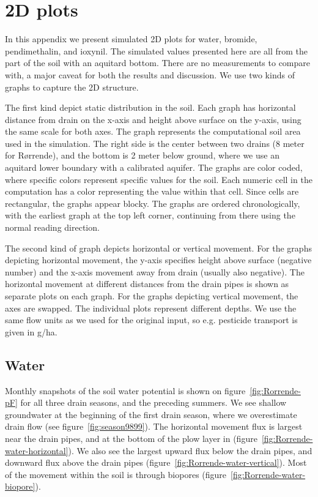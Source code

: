 \newcommand{\figrorrende}[1]{\texttt{[image: fig/\#1]}}
\newcommand{\figrorrendel}[1]{\hspace*{-2cm}\figrorrende{#1}}

\chapter{2D plots}
\label{app:plot-2d}

In this appendix we present simulated 2D plots for water, bromide,
pendimethalin, and ioxynil.  The simulated values presented here are
all from the part of the soil with an aquitard bottom.  There are no
measurements to compare with, a major caveat for both the results and
discussion.  We use two kinds of graphs to capture the 2D structure.

The first kind depict static distribution in the soil.  Each graph has
horizontal distance from drain on the x-axis and height above surface
on the y-axis, using the same scale for both axes.  The graph
represents the computational soil area used in the simulation.
The right side is the center between two drains (8 meter for
R{\o}rrende), and the bottom is 2 meter below ground, where we use an
aquitard lower boundary with a calibrated aquifer.  The graphs are
color coded, where specific colors represent specific values for the
soil.  Each numeric cell in the computation has a color representing
the value within that cell.  Since cells are rectangular, the graphs
appear blocky.  The graphs are ordered chronologically, with the
earliest graph at the top left corner, continuing from there using the
normal reading direction.

The second kind of graph depicts horizontal or vertical movement.  For
the graphs depicting horizontal movement, the y-axis specifies height
above surface (negative number) and the x-axis movement away from
drain (usually also negative).  The horizontal movement at different
distances from the drain pipes is shown as separate plots on each
graph.  For the graphs depicting vertical movement, the axes are
swapped.  The individual plots represent different depths.  We use the
same flow units as we used for the original input, so e.g. pesticide
transport is given in g/ha.

\FloatBarrier
\section{Water}

Monthly snapshots of the soil water potential is shown on
figure~\ref{fig:Rorrende-pF} for all three drain seasons, and the
preceding summers. We see shallow groundwater at the beginning of the
first drain season, where we overestimate drain flow (see
figure~\ref{fig:season9899}).  The horizontal movement flux is largest
near the drain pipes, and at the bottom of the plow layer in
(figure~\ref{fig:Rorrende-water-horizontal}).  We also see the largest
upward flux below the drain pipes, and downward flux above the drain
pipes (figure~\ref{fig:Rorrende-water-vertical}).  Most of the
movement within the soil is through biopores
(figure~\ref{fig:Rorrende-water-biopore}).

